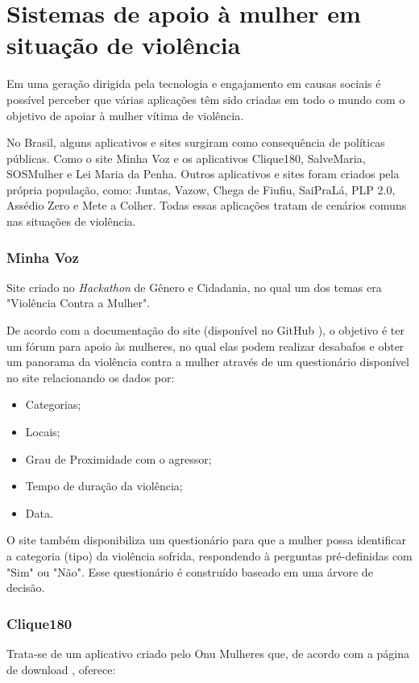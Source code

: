 \chapter{Sistemas de apoio à mulher em situação de violência} \label{cap:sistemas_relacionados}

Em uma geração dirigida pela tecnologia e engajamento em causas sociais é possível perceber que várias aplicações têm sido criadas em todo o mundo com o objetivo de apoiar à mulher vítima de violência.

No Brasil, alguns aplicativos e sites surgiram como consequência de políticas públicas. Como o site Minha Voz \cite{minhavoz_site} e 
os aplicativos Clique180, SalveMaria, SOSMulher e Lei Maria da Penha. Outros aplicativos e sites foram criados pela própria população, como: Juntas, Vazow, 
Chega de Fiufiu, 
SaiPraLá, PLP 2.0, Assédio Zero e Mete a Colher. Todas essas aplicações tratam de cenários comuns nas situações de 
violência.

\subsection*{Minha Voz}

Site criado no \textit{Hackathon} de Gênero e Cidadania, no qual
um dos temas era "Violência Contra a Mulher". 

De acordo com a documentação do site (disponível no GitHub \cite{minhavoz_repo}), o objetivo é ter um fórum para apoio às mulheres, no qual elas podem
realizar desabafos e obter um panorama da violência contra a mulher através de um questionário
disponível no site relacionando os dados por:

\begin{itemize}
	\item Categorias;
	\item Locais;
	\item Grau de Proximidade com o agressor;
	\item Tempo de duração da violência;
	\item Data.
\end{itemize}

O site também disponibiliza um questionário para que a mulher possa identificar a categoria (tipo) da violência sofrida, respondendo à perguntas pré-definidas 
com "Sim" ou "Não". Esse questionário é construído baseado em uma árvore de decisão.

\vfill

\subsection*{Clique180}
Trata-se de um aplicativo criado pelo Onu Mulheres que, de acordo com
a página de download \cite{clique_180}, oferece:

